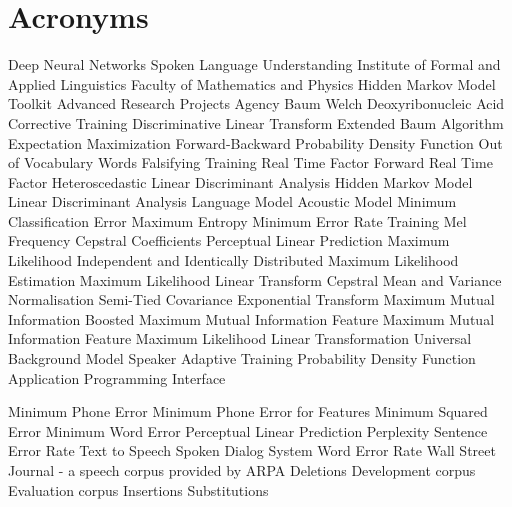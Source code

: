 \chapter{Acronyms}
\label{cha:acronyms}

\begin{acronym}[TDMA]
     {Deep Neural Networks}
     {Spoken Language Understanding}
     {Institute of Formal and Applied Linguistics}
     {Faculty of Mathematics and Physics}
     {Hidden Markov Model Toolkit}
     {Advanced Research Projects Agency}
     {Baum Welch}
     {Deoxyribonucleic Acid}
     {Corrective Training}
     {Discriminative Linear Transform}
     {Extended Baum Algorithm}
     {Expectation Maximization}
     {Forward-Backward}
     {Probability Density Function}
     {Out of Vocabulary Words}
     {Falsifying Training}
     {Real Time Factor}
     {Forward Real Time Factor}
     {Heteroscedastic Linear Discriminant Analysis}
     {Hidden Markov Model}
     {Linear Discriminant Analysis}
     {Language Model}
     {Acoustic Model}
     {Minimum Classification Error}
     {Maximum Entropy}
     {Minimum Error Rate Training}
     {Mel Frequency Cepstral Coefficients}
     {Perceptual Linear Prediction}
     {Maximum Likelihood}
     {Independent and Identically Distributed}
     {Maximum Likelihood Estimation}
     {Maximum Likelihood Linear Transform}
     {Cepstral Mean and Variance Normalisation}
     {Semi-Tied Covariance}
     {Exponential Transform}
     {Maximum Mutual Information}
     {Boosted Maximum Mutual Information}
     {Feature Maximum Mutual Information}
     {Feature Maximum Likelihood Linear Transformation}
     {Universal Background Model}
     {Speaker Adaptive Training}
     {Probability Density Function}
     {Application Programming Interface}

     {Minimum Phone Error}
     {Minimum Phone Error for Features}
     {Minimum Squared Error}
     {Minimum Word Error}
     {Perceptual Linear Prediction}
     {Perplexity}
     {Sentence Error Rate}
     {Text to Speech}
     {Spoken Dialog System}
     {Word Error Rate}
     {Wall Street Journal - a speech corpus provided by ARPA}
     {Deletions}
     {Development corpus}
     {Evaluation corpus}
     {Insertions}
     {Substitutions}
\end{acronym}

